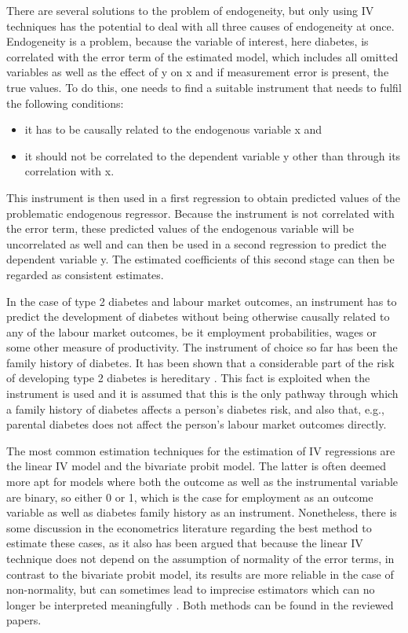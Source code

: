 There are several solutions to the problem of endogeneity, but only using \ac{IV} techniques has the potential to deal with all three causes of endogeneity at once. Endogeneity is a problem, because the variable of interest, here diabetes, is correlated with the error term of the estimated model, which includes all omitted variables as well as the effect of y on x and if measurement error is present, the true values. To do this, one needs to find a suitable instrument that needs to fulfil the following conditions:
\begin{itemize}
\item	it has to be causally related to the endogenous variable x and
\item	it should not be correlated to the dependent variable y other than through its correlation with x.
\end{itemize}
This instrument is then used in a first regression to obtain predicted values of the problematic endogenous regressor. Because the instrument is not correlated with the error term, these predicted values of the endogenous variable will be uncorrelated as well and can then be used in a second regression to predict the dependent variable y. The estimated coefficients of this second stage can then be regarded as consistent estimates.

In the case of type 2 diabetes and labour market outcomes, an instrument has to predict the development of diabetes without being otherwise causally related to any of the labour market outcomes, be it employment probabilities, wages or some other measure of productivity. The instrument of choice so far has been the family history of diabetes. It has been shown that a considerable part of the risk of developing type 2 diabetes is hereditary \parencite{Herder2011,Hemminki2010,TheInteractConsortium2013}. This fact is exploited when the instrument is used and it is assumed that this is the only pathway through which a family history of diabetes affects a person's diabetes risk, and also that, e.g., parental diabetes does not affect the person's labour market outcomes directly.

The most common estimation techniques for the estimation of \ac{IV} regressions are the linear \ac{IV} model and the bivariate probit model. The latter is often deemed more apt for models where both the outcome as well as the instrumental variable are binary, so either 0 or 1, which is the case for employment as an outcome variable as well as diabetes family history as an instrument. Nonetheless, there is some discussion in the econometrics literature regarding the best method to estimate these cases, as it also has been argued that because the linear \ac{IV} technique does not depend on the assumption of normality of the error terms, in contrast to the bivariate probit model, its results are more reliable in the case of non-normality, but can sometimes lead to imprecise estimators which can no longer be interpreted meaningfully \parencite{Chiburis2012}. Both methods can be found in the reviewed papers.

